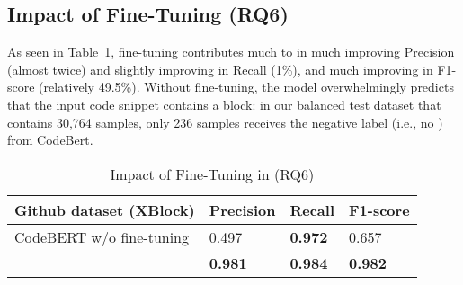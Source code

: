 \subsection{Impact of Fine-Tuning (RQ6)}
\label{sec:rq6}



As seen in Table~\ref{tab:codebert}, fine-tuning contributes much to
{\tool} in much improving Precision (almost twice) and slightly
improving in Recall (1\%), and much improving in F1-score (relatively
49.5\%). Without fine-tuning, the model 
overwhelmingly predicts that the input code snippet contains a
 block: in our balanced test dataset that contains
30,764 samples, only 236 samples receives the negative label (i.e., no
) from CodeBert.



\begin{table}[t]%
  \caption{Impact of Fine-Tuning in {\tool} (RQ6)}
  \vspace{-12pt}
  \small
	\begin{center}
		\renewcommand{\arraystretch}{1}
		\begin{tabular}{| p{3.15cm}<{\centering} | p{1.2cm}<{\centering} | p{1.2cm}<{\centering}| p{1.2cm}<{\centering}|}
		  \hline
			Github dataset (XBlock)  & Precision  &  Recall & F1-score \\
			\hline
			CodeBERT w/o fine-tuning & 0.497  & \textbf{0.972}   & 0.657\\
			\hline
			\tool   &  \textbf{0.981} &  {\bf 0.984} & \textbf{0.982}\\
			\hline
		\end{tabular}
		\label{tab:codebert}
	\end{center}
\end{table}
